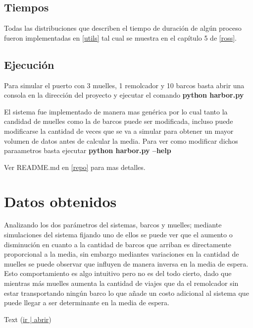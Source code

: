 	\subsection{Tiempos}
		Todas las distribuciones que describen el tiempo de duraci\'on de alg\'un
		proceso fueron implementadas en \ref{utils} tal cual se muestra en el cap\'itulo 5
		de \ref{ross}.

	\subsection{Ejecuci\'on}
		Para simular el puerto con 3 muelles, 1 remolcador y 10 barcos basta abrir 
		una consola en la direcci\'on del proyecto y ejecutar el comando
		\bf{python harbor.py}
		
		El sistema fue implementado de manera mas gen\'erica por lo cual tanto la candidad
		de muelles como la de barcos puede ser modificada, incluso puede
		modificarse la cantidad de veces que se va a simular para obtener un mayor volumen
		de datos antes de calcular la media.
		Para ver como modificar dichos paraametros basta ejecutar
		\bf{python harbor.py --help}

		Ver README.md en \ref{repo} para mas detalles.

\section{Datos obtenidos}
	Analizando los dos par\'ametros del sistemas, barcos y muelles; mediante
	simulaciones del sistema fijando uno de ellos se puede ver que el aumento o
	disminuci\'on en cuanto a la cantidad de barcos que arriban es directamente proporcional
	a la media, sin embargo mediantes variaciones en la cantidad de muelles se puede 
	observar que influyen de manera inversa en la media de espera. 
	Esto comportamiento es algo intuitivo pero no es del todo cierto, dado que mientras
	m\'as muelles aumenta la cantidad de viajes que da el remolcador sin estar 
	transportando ning\'un barco lo que a\~nade un costo adicional al sistema que puede
	llegar a ser determinante en la media de espera.
	


\begin{thebibliography}{99}
	 Text (\href{url}{ir | abrir})
\end{thebibliography}
